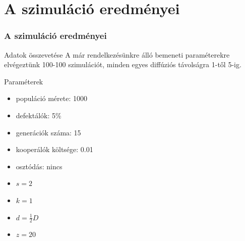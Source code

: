 \section{A szimuláció eredményei}
\begin{frame}
\frametitle{A szimuláció eredményei}
\begin{block}{Adatok összevetése}
A már rendelkezésünkre álló bemeneti paraméterekre\cite{archetti2016cooperation} elvégeztünk 100-100 szimulációt, minden egyes diffúziós távolságra 1-től 5-ig.
\end{block}

\begin{block}{Paraméterek}
\begin{multicols}{2}
	\begin{itemize}
		\item populáció mérete: 1000
		\item defektálók: 5\%
		\item generációk száma: 15
		\item kooperálók költsége: 0.01
		\item osztódás: nincs
	\end{itemize}
	\begin{itemize}
		\item $s = 2$
		\item $k = 1$
		\item $d = \frac{1}{2}D$
		\item $z = 20$
	\end{itemize}	
\end{multicols}
\end{block}
\end{frame}

